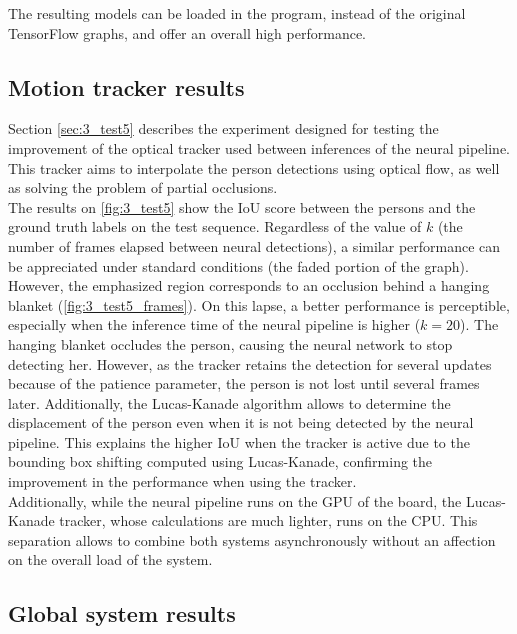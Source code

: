 The resulting models can be loaded in the program, instead of the original TensorFlow graphs, and offer an overall high performance.

\subsection{Motion tracker results}

Section \ref{sec:3_test5} describes the experiment designed for testing the improvement of the optical tracker used between inferences of the neural pipeline. This tracker aims to interpolate the person detections using optical flow, as well as solving the problem of partial occlusions.\\

The results on \autoref{fig:3_test5} show the IoU score between the persons and the ground truth labels on the test sequence. Regardless of the value of $k$ (the number of frames elapsed between neural detections), a similar performance can be appreciated under standard conditions (the faded portion of the graph). However, the emphasized region corresponds to an occlusion behind a hanging blanket (\autoref{fig:3_test5_frames}). On this lapse, a better performance is perceptible, especially when the inference time of the neural pipeline is higher ($k=20$). The hanging blanket occludes the person, causing the neural network to stop detecting her. However, as the tracker retains the detection for several updates because of the patience parameter, the person is not lost until several frames later. Additionally, the Lucas-Kanade algorithm allows to determine the displacement of the person even when it is not being detected by the neural pipeline. This explains the higher IoU when the tracker is active due to the bounding box shifting computed using Lucas-Kanade, confirming the improvement in the performance when using the tracker.\\

Additionally, while the neural pipeline runs on the GPU of the board, the Lucas-Kanade tracker, whose calculations are much lighter, runs on the CPU. This separation allows to combine both systems asynchronously without an affection on the overall load of the system.



\subsection{Global system results}

